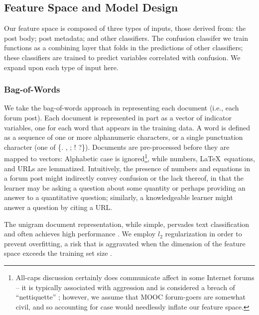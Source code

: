 \documentclass{edm_template}
\begin{document}
\subsection{Feature Space and Model Design}
Our feature space is composed of three types of inputs, those derived from: the post body; post metadata; and other classifiers. The confusion classifer we train functions as a combining layer that folds in the predictions of other classifiers; these classifiers are trained to predict variables correlated with confusion. We expand upon each type of input here.

\subsubsection{Bag-of-Words}
We take the bag-of-words approach in representing each document (i.e., each forum post). Each document is represented in part as a vector of indicator variables, one for each word that appears in the training data. A word is defined as a sequence of one or more alphanumeric characters, or a single punctuation character (one of \{. , ; ! ?\}). Documents are pre-processed before they are mapped to vectors: Alphabetic case is ignored\footnote{All-caps discussion certainly does communicate affect in some Internet forums -- it is typically associated with aggression and is considered a breach of ``nettiquette'' \cite{hambridge1995netiquette}; however, we assume that MOOC forum-goers are somewhat civil, and so accounting for case would needlessly inflate our feature space.}, while numbers, \LaTeX\ equations, and URLs are lemmatized. Intuitively, the presence of numbers and equations in a forum post might indirectly convey confusion or the lack thereof, in that the learner may be asking a question about some quantity or perhaps providing an answer to a quantitative question; similarly, a knowledgeable learner might answer a question by citing a URL. 

The unigram document representation, while simple, pervades text classification and often achieves high performance \cite{boulis2005text}. We employ $l_{2}$ regularization in order to prevent overfitting, a risk that is aggravated when the dimension of the feature space exceeds the training set size \cite{Ng:2004:FSL:1015330.1015435}.
\end{document}
